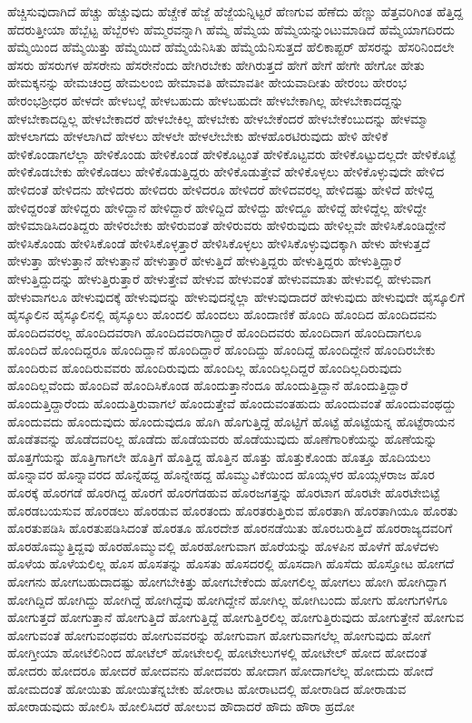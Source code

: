 {ಹೆಚ್ಚಿಸುವುದಾಗಿದೆ
ಹೆಚ್ಚು
ಹೆಚ್ಚುವುದು
ಹೆಚ್ಚೇಕೆ
ಹೆಜ್ಜೆ
ಹೆಜ್ಜೆಯನ್ನಿಟ್ಟರೆ
ಹೆಣಗುವ
ಹೆಣೆದು
ಹೆಣ್ಣು
ಹೆತ್ತವರಿಗಿಂತ
ಹೆತ್ತಿದ್ದ
ಹೆದರುತ್ತೀಯಾ
ಹೆಬ್ಬೆಟ್ಟ
ಹೆಬ್ಬೆರಳು
ಹೆಮ್ಮರವನ್ನಾಗಿ
ಹೆಮ್ಮೆ
ಹೆಮ್ಮೆಯ
ಹೆಮ್ಮೆಯನ್ನುಂಟುಮಾಡಿದೆ
ಹೆಮ್ಮೆಯಾಗದಿರದು
ಹೆಮ್ಮೆಯಿಂದ
ಹೆಮ್ಮೆಯಿತ್ತು
ಹೆಮ್ಮೆಯಿದೆ
ಹೆಮ್ಮೆಯೆನಿಸಿತು
ಹೆಮ್ಮೆಯೆನಿಸುತ್ತದೆ
ಹೆಲಿಕಾಪ್ಟರ್
ಹೆಸರನ್ನು
ಹೆಸರಿನಿಂದಲೇ
ಹೆಸರು
ಹೆಸರುಗಳ
ಹೆಸರೇನು
ಹೆಸರೇನೆಂದು
ಹೇಗಿರಬೇಕು
ಹೇಗಿರುತ್ತದೆ
ಹೇಗೆ
ಹೇಗೆ
ಹೇಗೇ
ಹೇಗೋ
ಹೇತು
ಹೇಮಕ್ಕನನ್ನು
ಹೇಮಚಂದ್ರ
ಹೇಮಲಂಬಿ
ಹೇಮಾವತಿ
ಹೇಮಾವತೀ
ಹೇಯವಾದೀತು
ಹೇರಂಬ
ಹೇರಂಭ
ಹೇರಂಭಶ್ರೀಧರ
ಹೇಳದೇ
ಹೇಳಬಲ್ಲೆ
ಹೇಳಬಹುದು
ಹೇಳಬಹುದೇ
ಹೇಳಬೇಕಾಗಿಲ್ಲ
ಹೇಳಬೇಕಾದದ್ದನ್ನು
ಹೇಳಬೇಕಾದದ್ದಿಲ್ಲ
ಹೇಳಬೇಕಾದರೆ
ಹೇಳಬೇಕಿಲ್ಲ
ಹೇಳಬೇಕು
ಹೇಳಬೇಕೆಂದರೆ
ಹೇಳಬೇಕೆಂಬುದನ್ನು
ಹೇಳಮ್ಮಾ
ಹೇಳಲಾಗದು
ಹೇಳಲಾಗಿದೆ
ಹೇಳಲು
ಹೇಳಲೇ
ಹೇಳಲೇಬೇಕು
ಹೇಳಹೊರಟಿರುವುದು
ಹೇಳಿ
ಹೇಳಿಕೆ
ಹೇಳಿಕೊಂಡಾಗಲೆಲ್ಲಾ
ಹೇಳಿಕೊಂಡು
ಹೇಳಿಕೊಂಡೆ
ಹೇಳಿಕೊಟ್ಟಂತೆ
ಹೇಳಿಕೊಟ್ಟವರು
ಹೇಳಿಕೊಟ್ಟುದಲ್ಲದೇ
ಹೇಳಿಕೊಟ್ಟೆ
ಹೇಳಿಕೊಡಬೇಕು
ಹೇಳಿಕೊಡಲು
ಹೇಳಿಕೊಡುತ್ತಿದ್ದರು
ಹೇಳಿಕೊಡುತ್ತೇವೆ
ಹೇಳಿಕೊಳ್ಳಲು
ಹೇಳಿಕೊಳ್ಳುವುದೇ
ಹೇಳಿದ
ಹೇಳಿದಂತೆ
ಹೇಳಿದನು
ಹೇಳಿದರು
ಹೇಳಿದರು
ಹೇಳಿದರೂ
ಹೇಳಿದರೆ
ಹೇಳಿದವರಲ್ಲ
ಹೇಳಿದಷ್ಟು
ಹೇಳಿದೆ
ಹೇಳಿದ್ದ
ಹೇಳಿದ್ದರಂತೆ
ಹೇಳಿದ್ದರು
ಹೇಳಿದ್ದಾನೆ
ಹೇಳಿದ್ದಾರೆ
ಹೇಳಿದ್ದಿದೆ
ಹೇಳಿದ್ದು
ಹೇಳಿದ್ದೂ
ಹೇಳಿದ್ದೆ
ಹೇಳಿದ್ದೆಲ್ಲ
ಹೇಳಿದ್ದೇ
ಹೇಳಿಮಾಡಿಸಿದಂತಿದ್ದರು
ಹೇಳಿರಬೇಕು
ಹೇಳಿರುವಂತೆ
ಹೇಳಿರುವರು
ಹೇಳಿರುವುದು
ಹೇಳಿಲ್ಲವೇ
ಹೇಳಿಸಿಕೊಂಡಿದ್ದೇನೆ
ಹೇಳಿಸಿಕೊಂಡು
ಹೇಳಿಸಿಕೊಂಡೆ
ಹೇಳಿಸಿಕೊಳ್ಳತ್ತಾರೆ
ಹೇಳಿಸಿಕೊಳ್ಳಲು
ಹೇಳಿಸಿಕೊಳ್ಳುವುದಕ್ಕಾಗಿ
ಹೇಳು
ಹೇಳುತ್ತದೆ
ಹೇಳುತ್ತಾ
ಹೇಳುತ್ತಾನೆ
ಹೇಳುತ್ತಾನೆ
ಹೇಳುತ್ತಾರೆ
ಹೇಳುತ್ತಿದೆ
ಹೇಳುತ್ತಿದ್ದರು
ಹೇಳುತ್ತಿದ್ದರು
ಹೇಳುತ್ತಿದ್ದಾರೆ
ಹೇಳುತ್ತಿದ್ದುದನ್ನು
ಹೇಳುತ್ತಿರುತ್ತಾರೆ
ಹೇಳುತ್ತೇವೆ
ಹೇಳುವ
ಹೇಳುವಂತೆ
ಹೇಳುವಮಾತು
ಹೇಳುವಲ್ಲಿ
ಹೇಳುವಾಗ
ಹೇಳುವಾಗಲೂ
ಹೇಳುವುದಕ್ಕೆ
ಹೇಳುವುದನ್ನು
ಹೇಳುವುದನ್ನೆಲ್ಲಾ
ಹೇಳುವುದಾದರೆ
ಹೇಳುವುದು
ಹೇಳುವುದೇ
ಹೈಸ್ಕೂಲಿಗೆ
ಹೈಸ್ಕೂಲಿನ
ಹೈಸ್ಕೂಲಿನಲ್ಲಿ
ಹೈಸ್ಕೂಲು
ಹೊಂದಲಿ
ಹೊಂದಲು
ಹೊಂದಾಣಿಕೆ
ಹೊಂದಿ
ಹೊಂದಿದ
ಹೊಂದಿದವನು
ಹೊಂದಿದವರಲ್ಲ
ಹೊಂದಿದವರಾಗಿ
ಹೊಂದಿದವರಾಗಿದ್ದಾರೆ
ಹೊಂದಿದವರು
ಹೊಂದಿದಾಗ
ಹೊಂದಿದಾಗಲೂ
ಹೊಂದಿದೆ
ಹೊಂದಿದ್ದರೂ
ಹೊಂದಿದ್ದಾನೆ
ಹೊಂದಿದ್ದಾರೆ
ಹೊಂದಿದ್ದು
ಹೊಂದಿದ್ದೆ
ಹೊಂದಿದ್ದೇನೆ
ಹೊಂದಿರಬೇಕು
ಹೊಂದಿರುವ
ಹೊಂದಿರುವವರು
ಹೊಂದಿರುವುದು
ಹೊಂದಿಲ್ಲ
ಹೊಂದಿಲ್ಲದಿದ್ದರೆ
ಹೊಂದಿಲ್ಲದಿರುವುದು
ಹೊಂದಿಲ್ಲವೆಂದು
ಹೊಂದಿವೆ
ಹೊಂದಿಸಿಕೊಂಡ
ಹೊಂದುತ್ತಾನೆಂದೂ
ಹೊಂದುತ್ತಿದ್ದಾನೆ
ಹೊಂದುತ್ತಿದ್ದಾರೆ
ಹೊಂದುತ್ತಿದ್ದಾರೆಂದು
ಹೊಂದುತ್ತಿರುವಾಗಲೆ
ಹೊಂದುತ್ತೇವೆ
ಹೊಂದುವಂತಹುದು
ಹೊಂದುವಂತೆ
ಹೊಂದುವಂಥದ್ದು
ಹೊಂದುವದು
ಹೊಂದುವುದು
ಹೊಂದುವುದೂ
ಹೊಗಿ
ಹೊಗುತ್ತಿದ್ದೆ
ಹೊಟ್ಟಿಗೆ
ಹೊಟ್ಟೆ
ಹೊಟ್ಟೆಯನ್ನ
ಹೊಟ್ಟೆರಾಯನ
ಹೊಡೆತವನ್ನು
ಹೊಡೆದವರಿಲ್ಲ
ಹೊಡೆದು
ಹೊಡೆಯವರು
ಹೊಡೆಯುವುದು
ಹೊಣೆಗಾರಿಕೆಯನ್ನು
ಹೊಣೆಯನ್ನು
ಹೊತ್ತಗೆಯನ್ನು
ಹೊತ್ತಿಗಾಗಲೇ
ಹೊತ್ತಿಗೆ
ಹೊತ್ತಿದ್ದ
ಹೊತ್ತಿನ
ಹೊತ್ತು
ಹೊತ್ತುಕೊಂಡು
ಹೊತ್ತೂ
ಹೊದಿಯಲು
ಹೊನ್ನಾವರ
ಹೊನ್ನಾವರದ
ಹೊನ್ನೆಹದ್ದ
ಹೊನ್ನೇಹದ್ದ
ಹೊಮ್ಮುವಿಕೆಯಿಂದ
ಹೊಯ್ಸಳರ
ಹೊಯ್ಸಳರಾಜ
ಹೊರ
ಹೊರಕ್ಕೆ
ಹೊರಗಡೆ
ಹೊರಗಿದ್ದ
ಹೊರಗೆ
ಹೊರಗೆಡಹುವ
ಹೊರಜಗತ್ತನ್ನು
ಹೊರಟಾಗ
ಹೊರಟೇ
ಹೊರಟೇಬಿಟ್ಟೆ
ಹೊರಡಬಯಸುವ
ಹೊರಡಲು
ಹೊರಡುವ
ಹೊರತಂದು
ಹೊರತರುತ್ತಿರುವ
ಹೊರತಾಗಿ
ಹೊರತಾಗಿಯೂ
ಹೊರತು
ಹೊರತುಪಡಿಸಿ
ಹೊರತುಪಡಿಸಿದಂತೆ
ಹೊರತೂ
ಹೊರದೇಶ
ಹೊರನಡೆಯಿತು
ಹೊರಬರುತ್ತಿದೆ
ಹೊರರಾಜ್ಯದವರಿಗೆ
ಹೊರಹೊಮ್ಮುತ್ತಿದ್ದವು
ಹೊರಹೊಮ್ಮುವಲ್ಲಿ
ಹೊರಹೋಗುವಾಗ
ಹೊರೆಯನ್ನು
ಹೊಳಪಿನ
ಹೊಳೆಗೆ
ಹೊಳೆದಳು
ಹೊಳೆಯ
ಹೊಳೆಯಲಿಲ್ಲ
ಹೊಸ
ಹೊಸತನ್ನು
ಹೊಸತು
ಹೊಸದರಲ್ಲಿ
ಹೊಸದಾಗಿ
ಹೊಸೆದು
ಹೊಸ್ತೋಟ
ಹೋಗದೆ
ಹೋಗನು
ಹೋಗಬಹುದಾದಷ್ಟು
ಹೋಗಬೇಕಿತ್ತು
ಹೋಗಬೇಕೆಂದು
ಹೋಗಲಿಲ್ಲ
ಹೋಗಲು
ಹೋಗಿ
ಹೋಗಿದ್ದಾಗ
ಹೋಗಿದ್ದಿದೆ
ಹೋಗಿದ್ದು
ಹೋಗಿದ್ದೆ
ಹೋಗಿದ್ದೆವು
ಹೋಗಿದ್ದೇನೆ
ಹೋಗಿಲ್ಲ
ಹೋಗಿಬಂದು
ಹೋಗು
ಹೋಗುಗಳಿಗೂ
ಹೋಗುತ್ತದೆ
ಹೋಗುತ್ತಾನೆ
ಹೋಗುತ್ತಿದೆ
ಹೋಗುತ್ತಿದ್ದೆ
ಹೋಗುತ್ತಿರಲಿಲ್ಲ
ಹೋಗುತ್ತಿರುವುದು
ಹೋಗುತ್ತೇನೆ
ಹೋಗುವ
ಹೋಗುವಂತೆ
ಹೋಗುವಂಥವರು
ಹೋಗುವವರನ್ನು
ಹೋಗುವಾಗ
ಹೋಗುವಾಗಲೆಲ್ಲ
ಹೋಗುವುದು
ಹೋಗೆ
ಹೋಗ್ತೀಯಾ
ಹೋಟೆಲಿನಿಂದ
ಹೋಟೆಲ್
ಹೋಟೇಲಲ್ಲಿ
ಹೋಟೇಲುಗಳಲ್ಲಿ
ಹೋಟೇಲ್
ಹೋದ
ಹೋದಂತೆ
ಹೋದರು
ಹೋದರೂ
ಹೋದರೆ
ಹೋದವನು
ಹೋದವರು
ಹೋದಾಗ
ಹೋದಾಗಲೆಲ್ಲ
ಹೋದುದು
ಹೋದೆ
ಹೋಮದಂತೆ
ಹೋಯಿತು
ಹೋಯಿತೆನ್ನಬೇಕು
ಹೋರಾಟ
ಹೋರಾಟದಲ್ಲಿ
ಹೋರಾಡಿದ
ಹೋರಾಡುವ
ಹೋರಾಡುವುದು
ಹೋಲಿಸಿ
ಹೋಲಿಸಿದರೆ
ಹೋಲುವ
ಹೌದಾದರೆ
ಹೌದು
ಹೌರಾ
ಹ್ರದೋ
}
